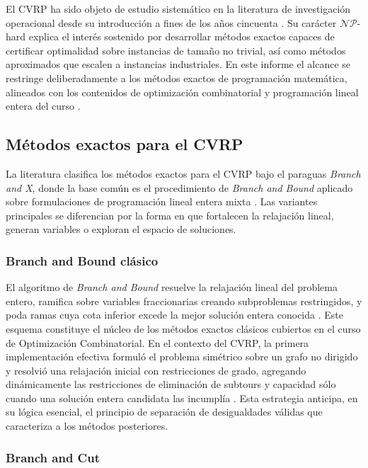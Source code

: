 El CVRP ha sido objeto de estudio sistemático en la literatura de investigación
operacional desde su introducción a fines de los años cincuenta \parencite{dantzig1959truck}. Su carácter
$\mathcal{NP}$-hard \parencite{lenstra1981complexity} explica el interés sostenido por
desarrollar métodos exactos capaces de certificar optimalidad sobre instancias de tamaño
no trivial, así como métodos aproximados que escalen a instancias industriales. En este
informe el alcance se restringe deliberadamente a los métodos exactos de programación
matemática, alineados con los contenidos de optimización combinatorial y programación
lineal entera del curso \parencite{tan2021vehicle}.

\subsection{Métodos exactos para el CVRP}

La literatura clasifica los métodos exactos para el CVRP bajo el paraguas
\textit{Branch and X}, donde la base común es el procedimiento de \textit{Branch and
Bound} aplicado sobre formulaciones de programación lineal entera mixta
\parencite{tan2021vehicle}. Las variantes principales se diferencian por la forma en que
fortalecen la relajación lineal, generan variables o exploran el espacio de soluciones.

\subsubsection{Branch and Bound clásico}

El algoritmo de \textit{Branch and Bound} resuelve la relajación lineal del problema
entero, ramifica sobre variables fraccionarias creando subproblemas restringidos, y poda
ramas cuya cota inferior excede la mejor solución entera conocida
\parencite{land1960automatic}. Este esquema constituye el núcleo de los métodos exactos
clásicos cubiertos en el curso de Optimización Combinatorial. En el contexto del CVRP,
la primera implementación efectiva formuló el problema simétrico sobre un grafo no
dirigido y resolvió una relajación inicial con restricciones de grado, agregando
dinámicamente las restricciones de eliminación de subtours y capacidad sólo cuando una
solución entera candidata las incumplía \parencite{laporte1983branch}. Esta estrategia
anticipa, en su lógica esencial, el principio de separación de desigualdades válidas que
caracteriza a los métodos posteriores.

\subsubsection{Branch and Cut}

